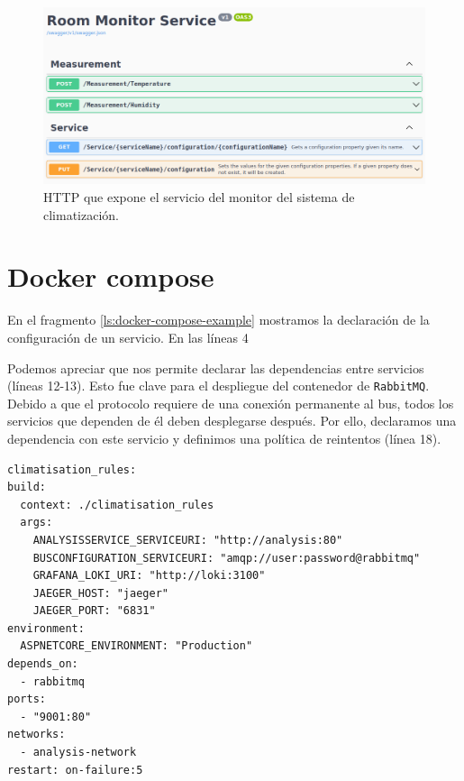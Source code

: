 \begin{figure}[h!]
  \hspace{-0.25cm}
  \includegraphics[scale=0.45]{anx_apis/images/apis-room-monitor}
  \caption{ HTTP que expone el servicio del monitor del sistema de climatización.}
\end{figure}

\pagebreak

\chapter{Docker compose}

En el fragmento \ref{ls:docker-compose-example} mostramos la declaración de la configuración de un servicio. En las líneas 4

Podemos apreciar que nos permite declarar las dependencias entre servicios (líneas 12-13). Esto fue clave para el despliegue del contenedor de \texttt{RabbitMQ}. Debido a que el protocolo requiere de una conexión permanente al bus\cite{johanssonPartRabbitMQBest2019}, todos los servicios que dependen de él deben desplegarse después. Por ello, declaramos una dependencia con este servicio y definimos una política de reintentos (línea 18).

\begin{lstlisting}[style=yaml,caption={Ejemplo de declaración de despliegue de un servicio en Docker Compose},captionpos=b, label=ls:docker-compose-example]
climatisation_rules:
build:
  context: ./climatisation_rules
  args:
    ANALYSISSERVICE_SERVICEURI: "http://analysis:80"
    BUSCONFIGURATION_SERVICEURI: "amqp://user:password@rabbitmq"
    GRAFANA_LOKI_URI: "http://loki:3100"
    JAEGER_HOST: "jaeger"
    JAEGER_PORT: "6831"
environment:
  ASPNETCORE_ENVIRONMENT: "Production"
depends_on:
  - rabbitmq
ports:
  - "9001:80"
networks:
  - analysis-network
restart: on-failure:5
  \end{lstlisting}
